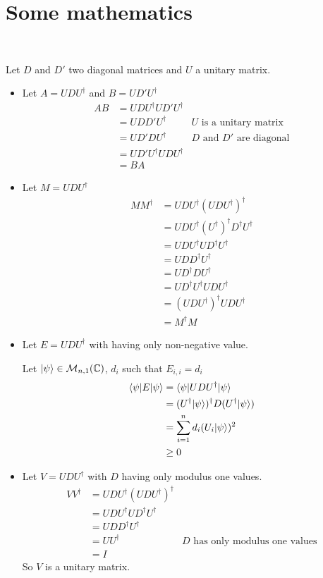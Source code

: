 \section{Some mathematics}

~

Let $D$ and $D'$ two diagonal matrices and $U$ a unitary matrix.

\begin{itemize}
  \item Let $A = UDU^\dagger$ and $B=UD'U^\dagger$
    \begin{align*}
      AB &= UDU^\dagger UD'U^\dagger \\
        &= UDD'U^\dagger & \text{$U$ is a unitary matrix} \\
        &= UD'DU^\dagger & \text{$D$ and $D'$ are diagonal} \\
        &= UD'U^\dagger UDU^\dagger \\
        &= BA
    \end{align*}
  \item Let $M = UDU^\dagger$
    \begin{align*}
      MM^\dagger &= UDU^\dagger (UDU^\dagger)^\dagger \\
      &= UDU^\dagger (U^\dagger)^\dagger D^\dagger U^\dagger \\
      &= UDU^\dagger U D^\dagger U^\dagger \\
      &= UDD^\dagger U^\dagger \\
      &= UD^\dagger D U^\dagger \\
      &= UD^\dagger U^\dagger  U D U^\dagger \\
      &= (UD U^\dagger)^\dagger U D U^\dagger \\
      &= M^\dagger M
    \end{align*}
  \item Let $E = UDU^\dagger$ with having only non-negative value.

    Let $| \psi \rangle \in \mathcal M_{n,1}(\mathbb C)$,
      $d_i$ such that $E_{i,i} = d_i$
    \begin{align*}
      \langle \psi | E | \psi \rangle &= \langle \psi | U D U^\dagger | \psi \rangle \\
      &= (U^\dagger | \psi \rangle)^\dagger D (U^\dagger | \psi \rangle) \\
      &= \sum^n_{i=1} d_i (U_i | \psi \rangle)^2 \\
      &\geq 0
    \end{align*}

  \item Let $V = UDU^\dagger$ with $D$ having only modulus one values.
    \begin{align*}
      VV^\dagger &= UDU^\dagger(UDU^\dagger)^\dagger \\
      &= UDU^\dagger UD^\dagger U^\dagger \\
      &= UDD^\dagger U^\dagger \\
      &= UU^\dagger & \text{$D$ has only modulus one values}\\
      &= I
    \end{align*}
    So $V$ is a unitary matrix.


\end{itemize}
